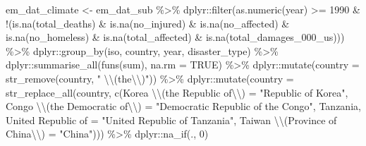 \documentclass[
  12pt,
]{article}
\newenvironment{Shaded}{}{}
\newcommand{\AttributeTok}[1]{\textcolor[rgb]{0.49,0.56,0.16}{#1}}
\newcommand{\ConstantTok}[1]{\textcolor[rgb]{0.53,0.00,0.00}{#1}}
\newcommand{\DecValTok}[1]{\textcolor[rgb]{0.25,0.63,0.44}{#1}}
\newcommand{\FunctionTok}[1]{\textcolor[rgb]{0.02,0.16,0.49}{#1}}
\newcommand{\NormalTok}[1]{#1}
\newcommand{\OtherTok}[1]{\textcolor[rgb]{0.00,0.44,0.13}{#1}}
\newcommand{\SpecialCharTok}[1]{\textcolor[rgb]{0.25,0.44,0.63}{#1}}
\newcommand{\StringTok}[1]{\textcolor[rgb]{0.25,0.44,0.63}{#1}}
\begin{document}
\begin{Shaded}
\begin{Highlighting}[]
\NormalTok{em\_dat\_climate }\OtherTok{\textless{}{-}}\NormalTok{ em\_dat\_sub }\SpecialCharTok{\%\textgreater{}\%}
\NormalTok{    dplyr}\SpecialCharTok{::}\FunctionTok{filter}\NormalTok{(}\FunctionTok{as.numeric}\NormalTok{(year) }\SpecialCharTok{\textgreater{}=} \DecValTok{1990} \SpecialCharTok{\&} 
        \SpecialCharTok{!}\NormalTok{(}\FunctionTok{is.na}\NormalTok{(total\_deaths) }\SpecialCharTok{\&} \FunctionTok{is.na}\NormalTok{(no\_injured) }\SpecialCharTok{\&} 
            \FunctionTok{is.na}\NormalTok{(no\_affected) }\SpecialCharTok{\&} \FunctionTok{is.na}\NormalTok{(no\_homeless) }\SpecialCharTok{\&} 
            \FunctionTok{is.na}\NormalTok{(total\_affected) }\SpecialCharTok{\&} \FunctionTok{is.na}\NormalTok{(total\_damages\_000\_us))) }\SpecialCharTok{\%\textgreater{}\%}
\NormalTok{    dplyr}\SpecialCharTok{::}\FunctionTok{group\_by}\NormalTok{(iso, country, year, disaster\_type) }\SpecialCharTok{\%\textgreater{}\%}
\NormalTok{    dplyr}\SpecialCharTok{::}\FunctionTok{summarise\_all}\NormalTok{(}\FunctionTok{funs}\NormalTok{(sum), }\AttributeTok{na.rm =} \ConstantTok{TRUE}\NormalTok{) }\SpecialCharTok{\%\textgreater{}\%}
\NormalTok{    dplyr}\SpecialCharTok{::}\FunctionTok{mutate}\NormalTok{(}\AttributeTok{country =} \FunctionTok{str\_remove}\NormalTok{(country, }
        \StringTok{" }\SpecialCharTok{\textbackslash{}\textbackslash{}}\StringTok{(the}\SpecialCharTok{\textbackslash{}\textbackslash{}}\StringTok{)"}\NormalTok{)) }\SpecialCharTok{\%\textgreater{}\%}
\NormalTok{    dplyr}\SpecialCharTok{::}\FunctionTok{mutate}\NormalTok{(}\AttributeTok{country =} \FunctionTok{str\_replace\_all}\NormalTok{(country, }
        \FunctionTok{c}\NormalTok{(}\StringTok{\textasciigrave{}}\AttributeTok{Korea }\SpecialCharTok{\textbackslash{}\textbackslash{}}\AttributeTok{(the Republic of}\SpecialCharTok{\textbackslash{}\textbackslash{}}\AttributeTok{)}\StringTok{\textasciigrave{}} \OtherTok{=} \StringTok{"Republic of Korea"}\NormalTok{, }
            \StringTok{\textasciigrave{}}\AttributeTok{Congo }\SpecialCharTok{\textbackslash{}\textbackslash{}}\AttributeTok{(the Democratic of}\SpecialCharTok{\textbackslash{}\textbackslash{}}\AttributeTok{)}\StringTok{\textasciigrave{}} \OtherTok{=} \StringTok{"Democratic Republic of the Congo"}\NormalTok{, }
            \StringTok{\textasciigrave{}}\AttributeTok{Tanzania, United Republic of}\StringTok{\textasciigrave{}} \OtherTok{=} \StringTok{"United Republic of Tanzania"}\NormalTok{, }
            \StringTok{\textasciigrave{}}\AttributeTok{Taiwan }\SpecialCharTok{\textbackslash{}\textbackslash{}}\AttributeTok{(Province of China}\SpecialCharTok{\textbackslash{}\textbackslash{}}\AttributeTok{)}\StringTok{\textasciigrave{}} \OtherTok{=} \StringTok{"China"}\NormalTok{))) }\SpecialCharTok{\%\textgreater{}\%}
\NormalTok{    dplyr}\SpecialCharTok{::}\FunctionTok{na\_if}\NormalTok{(., }\DecValTok{0}\NormalTok{)}


\end{Highlighting}
\end{Shaded}
\end{document}
